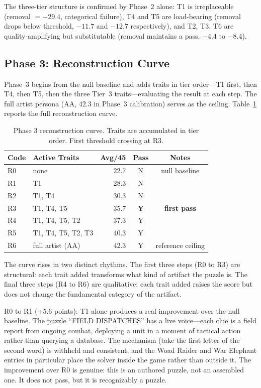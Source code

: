 The three-tier structure is confirmed by Phase~2 alone: T1 is irreplaceable (removal $= -29.4$, categorical failure), T4 and T5 are load-bearing (removal drops below threshold, $-11.7$ and $-12.7$ respectively), and T2, T3, T6 are quality-amplifying but substitutable (removal maintains a pass, $-4.4$ to $-8.4$).

\subsection{Phase 3: Reconstruction Curve}

Phase~3 begins from the null baseline and adds traits in tier order---T1 first, then T4, then T5, then the three Tier~3 traits---evaluating the result at each step. The full artist persona (AA, 42.3 in Phase~3 calibration) serves as the ceiling. Table~\ref{tab:phase3} reports the full reconstruction curve.

\begin{table}[h]
\centering
\caption{Phase 3 reconstruction curve. Traits are accumulated in tier order. First threshold crossing at R3.}
\label{tab:phase3}
\begin{tabular}{llrcc}
\hline
\textbf{Code} & \textbf{Active Traits} & \textbf{Avg/45} & \textbf{Pass} & \textbf{Notes} \\
\hline
R0 & none           & 22.7 & N & null baseline \\
R1 & T1             & 28.3 & N & \\
R2 & T1, T4         & 30.3 & N & \\
R3 & T1, T4, T5     & 35.7 & \textbf{Y} & \textbf{first pass} \\
R4 & T1, T4, T5, T2 & 37.3 & Y & \\
R5 & T1, T4, T5, T2, T3 & 40.3 & Y & \\
R6 & full artist (AA) & 42.3 & Y & reference ceiling \\
\hline
\end{tabular}
\end{table}

The curve rises in two distinct rhythms. The first three steps (R0 to R3) are structural: each trait added transforms what kind of artifact the puzzle is. The final three steps (R4 to R6) are qualitative: each trait added raises the score but does not change the fundamental category of the artifact.

R0 to R1 ($+5.6$ points): T1 alone produces a real improvement over the null baseline. The puzzle ``FIELD DISPATCHES'' has a live voice---each clue is a field report from ongoing combat, deploying a unit in a moment of tactical action rather than querying a database. The mechanism (take the first letter of the second word) is withheld and consistent, and the Woad Raider and War Elephant entries in particular place the solver inside the game rather than outside it. The improvement over R0 is genuine: this is an authored puzzle, not an assembled one. It does not pass, but it is recognizably a puzzle.

